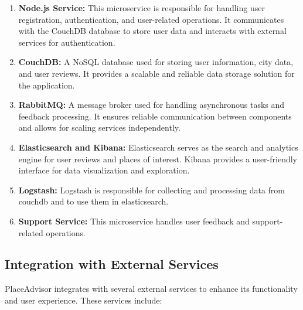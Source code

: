 \documentclass[../main.tex]{subfiles}
\begin{document}
\begin{enumerate}
    \item \textbf{Node.js Service:} This microservice is responsible for handling user registration, authentication, and user-related operations. It communicates with the CouchDB database to store user data and interacts with external services for authentication.
    
    \item \textbf{CouchDB:} A NoSQL database used for storing user information, city data, and user reviews. It provides a scalable and reliable data storage solution for the application.
    
    \item \textbf{RabbitMQ:} A message broker used for handling asynchronous tasks and feedback processing. It ensures reliable communication between components and allows for scaling services independently.
    
    \item \textbf{Elasticsearch and Kibana:} Elasticsearch serves as the search and analytics engine for user reviews and places of interest. Kibana provides a user-friendly interface for data visualization and exploration.
    
    \item \textbf{Logstash:} Logstash is responsible for collecting and processing data from couchdb and to use them in elasticsearch.
    
    \item \textbf{Support Service:} This microservice handles user feedback and support-related operations.
\end{enumerate}

\subsection{Integration with External Services}

PlaceAdvisor integrates with several external services to enhance its functionality and user experience. These services include:
\end{document}
